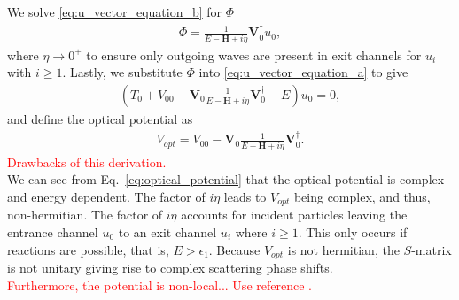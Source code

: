 \documentclass[preprintnumbers,floatfix,aps,prc,preprint,nofootinbib]{revtex4-1}
\begin{document}
%
We solve \ref{eq:u_vector_equation_b} for $\Phi$
%
\begin{eqnarray}
	\label{eq:phi}
	\Phi = \frac{1}{E - \textbf{H} + i \eta} \textbf{V}_0^{\dagger} u_0,
\end{eqnarray}
%
where $\eta \rightarrow 0^+$ to ensure only outgoing waves are present in exit channels for $u_i$ with $i \geq 1$. Lastly, we substitute $\Phi$ into \ref{eq:u_vector_equation_a} to give
%
\begin{eqnarray}
	\label{eq:u0_equation}
	(T_0 + V_{00}  - \textbf{V}_0 \frac{1}{E-\textbf{H}+i\eta} \textbf{V}_0^{\dagger} - E) u_0 = 0,
\end{eqnarray}
%
and define the optical potential as
%
\begin{eqnarray}
	\label{eq:optical_potential}
	V_{opt} = V_{00}  - \textbf{V}_0 \frac{1}{E-\textbf{H}+i\eta} \textbf{V}_0^{\dagger}.
\end{eqnarray}
%
\textcolor{red}{Drawbacks of this derivation.}
\\

We can see from Eq.~\ref{eq:optical_potential} that the optical potential is complex and energy dependent. The factor of $i \eta$ leads to $V_{opt}$ being complex, and thus, non-hermitian. The factor of $i \eta$ accounts for incident particles leaving the entrance channel $u_0$ to an exit channel $u_i$ where $i \geq 1$. This only occurs if reactions are possible, that is, $E > \epsilon_1$. Because $V_{opt}$ is not hermitian, the $S$-matrix is not unitary giving rise to complex scattering phase shifts.
\\

\textcolor{red}{Furthermore, the potential is non-local... Use reference \cite{Hodgson:1971ab}.}
\\
\end{document}
